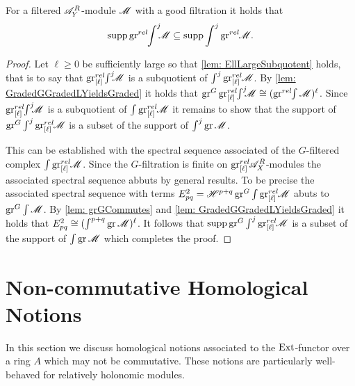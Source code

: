 \begin{proposition}\label{prop: SuppGrrelIntInclusion}
  For a filtered $\A_Y^R$-module $\M$ with a good filtration it holds that  $$\supp \grrel\IntJ{j}\M \subseteq \supp \int^j \grrel\M.$$
\end{proposition}
\begin{proof}
  Let $\ell\geq 0$ be sufficiently large so that \cref{lem: EllLargeSubquotent} holds, that is to say that $\grl\IntJ{j} \M$ is a subquotient of $\int^j \grl \M$.
  By \cref{lem: GradedGGradedLYieldsGraded} it holds that $\gr^G\grl \IntJ{j} \M \cong (\grrel\int\M)^\ell$.
  Since $\grl \IntJ{j} \M$ is a subquotient of $\int \grl\M$ it remains to show that the support of $\gr^G \int^j \grl\M$ is a subset of the support of $\int^j \gr \M$.

  This can be established with the spectral sequence associated of the $G$-filtered complex $\int \grl \M$. Since the $G$-filtration is finite on $\grl\A_X^R$-modules the associated spectral sequence abbuts by general results. To be precise the associated spectral sequence with terms
  $E^2_{pq} = \H^{p+q}\gr^G \int \grl \M$ abuts to $\gr^G\int \M$.
  By \cref{lem: grGCommutes} and \cref{lem: GradedGGradedLYieldsGraded} it holds that $E^2_{pq} \cong (\int^{p+q}\gr \M)^\ell$. 
  It follows that $\supp\gr^G \int^j \grl\M$ is a subset of the support of $\int \gr \M$ which completes the proof.
\end{proof}

\section{Non-commutative Homological Notions}
In this section we discuss homological notions associated to the $\Ext$-functor over a ring $A$ which may not be commutative.   These notions are particularly well-behaved for relatively holonomic modules.

